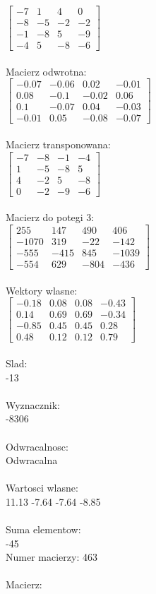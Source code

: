 \documentclass[a4paper,12pt]{article}
\begin{document}
$\begin{bmatrix} -7&1&4&0\\-8&-5&-2&-2\\-1&-8&5&-9\\-4&5&-8&-6 \end{bmatrix}$
\\
\\
Macierz odwrotna:\\

$\begin{bmatrix} -0.07&-0.06&0.02&-0.01\\0.08&-0.1&-0.02&0.06\\0.1&-0.07&0.04&-0.03\\-0.01&0.05&-0.08&-0.07 \end{bmatrix}$
\\
\\
Macierz transponowana:\\

$\begin{bmatrix} -7&-8&-1&-4\\1&-5&-8&5\\4&-2&5&-8\\0&-2&-9&-6 \end{bmatrix}$
\\
\\
Macierz do potegi 3:\\

$\begin{bmatrix} 255&147&490&406\\-1070&319&-22&-142\\-555&-415&845&-1039\\-554&629&-804&-436 \end{bmatrix}$
\\
\\
Wektory wlasne:\\

$\begin{bmatrix} -0.18&0.08&0.08&-0.43\\0.14&0.69&0.69&-0.34\\-0.85&0.45&0.45&0.28\\0.48&0.12&0.12&0.79 \end{bmatrix}$
\\
\\
Slad:\\
-13
\\
\\
Wyznacznik:\\
-8306
\\
\\
Odwracalnosc:\\
Odwracalna
\\
\\
Wartosci wlasne:\\
11.13 -7.64 -7.64 -8.85
\\
\\
Suma elementow:\\
-45
\\
\newpage
Numer macierzy:
463
\\
\\
Macierz:\\
\end{document}
